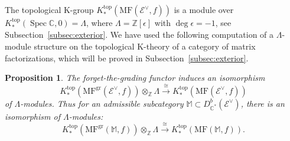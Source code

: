 \documentclass [11pt,oneside,a4paper,mathscr]{amsart}
\newtheorem{prop}[thm]{Proposition}
\theoremstyle{definition}
\newcommand{\X}{\mathscr{X}}
\newcommand{\Spec}{\operatorname{Spec}}
\begin{document}
The topological K-group $K^{\mathrm{top}}_{\ast}(\mathrm{MF}(\mathscr{E}^\vee, f))$ is a
module over $K^{\mathrm{top}}_{\ast}(\Spec \mathbb{C}, 0)=\Lambda$, where 
$\Lambda=\mathbb{Z}[\epsilon]$
with $\deg \epsilon=-1$, see Subsection~\ref{subsec:exterior}. 
We have used the following computation of a $\Lambda$-module structure on the topological K-theory of a category of matrix factorizations,
which will be proved in Subsection~\ref{subsec:exterior}. 

\begin{prop}\label{prop:forg}
    The forget-the-grading functor induces an isomorphism 
    \begin{equation}\label{isolambdatheta}
        K^{\mathrm{top}}_{\ast}(\mathrm{MF}^{\mathrm{gr}}(\mathscr{E}^\vee, f))\otimes_{\mathbb{Z}}\Lambda\xrightarrow{\cong} K^{\mathrm{top}}_{\ast}(\mathrm{MF}(\mathscr{E}^\vee, f))
    \end{equation} of $\Lambda$-modules. 
    Thus for an admissible subcategory 
    $\mathbb{M} \subset D^b_{\mathbb{C}^*}(\mathscr{E}^{\vee})$,
    there is an isomorphism of $\Lambda$-modules:
    \[K^{\mathrm{top}}_{\ast}(\mathrm{MF}^{\mathrm{gr}}(\mathbb{M}, f))\otimes_\mathbb{Z}\Lambda\xrightarrow{\cong} K^{\mathrm{top}}_{\ast}(\mathrm{MF}(\mathbb{M}, f)).\]
    \end{prop}





\end{document}
